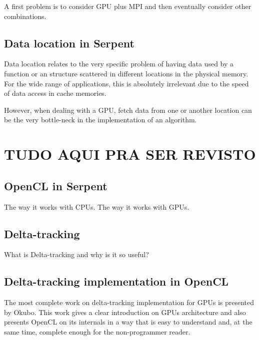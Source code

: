 \documentclass[twoside,a4paper,12pt,english]{anstrans}
\begin{document}
A first problem is to consider GPU plus MPI and then eventually consider other combinations.

\subsection{Data location in Serpent}

Data location relates to the very specific problem of having data used by a function or an
structure scattered in different locations in the physical memory. For the wide range of
applications, this is absolutely irrelevant due to the speed of data access in cache memories.

However, when dealing with a GPU, fetch data from one or another location can be the very
bottle-neck in the implementation of an algorithm.

\section{TUDO AQUI PRA SER REVISTO}

\subsection{OpenCL in Serpent}

The way it works with CPUs.
The way it works with GPUs.

\subsection{Delta-tracking}

What is Delta-tracking and why is it so useful?

\subsection{Delta-tracking implementation in OpenCL}

The most complete work on delta-tracking implementation for GPUs is presented
by Okubo\cite{Okubo2016}. This work gives a clear introduction on GPUs architecture
and also presents OpenCL on its internals in a way that is easy to understand and,
at the same time, complete enough for the non-programmer reader.
\end{document}
